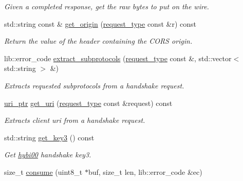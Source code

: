 \begin{DoxyCompactItemize}
\begin{DoxyCompactList}\small\item\em Given a completed response, get the raw bytes to put on the wire. \end{DoxyCompactList}\item 
std\+::string const  \& \hyperlink{classwebsocketpp_1_1processor_1_1hybi00_a6b52aa5ad8d93a153859545550ce41fc}{get\+\_\+origin} (\hyperlink{classwebsocketpp_1_1http_1_1parser_1_1request}{request\+\_\+type} const \&r) const\hypertarget{classwebsocketpp_1_1processor_1_1hybi00_a6b52aa5ad8d93a153859545550ce41fc}{}\label{classwebsocketpp_1_1processor_1_1hybi00_a6b52aa5ad8d93a153859545550ce41fc}

\begin{DoxyCompactList}\small\item\em Return the value of the header containing the C\+O\+RS origin. \end{DoxyCompactList}\item 
lib\+::error\+\_\+code \hyperlink{classwebsocketpp_1_1processor_1_1hybi00_a0d4555fa7475da449b2504ea95214f67}{extract\+\_\+subprotocols} (\hyperlink{classwebsocketpp_1_1http_1_1parser_1_1request}{request\+\_\+type} const \&, std\+::vector$<$ std\+::string $>$ \&)
\begin{DoxyCompactList}\small\item\em Extracts requested subprotocols from a handshake request. \end{DoxyCompactList}\item 
\hyperlink{namespacewebsocketpp_aae370ea5ac83a8ece7712cb39fc23f5b}{uri\+\_\+ptr} \hyperlink{classwebsocketpp_1_1processor_1_1hybi00_aa490b9d9905915023b5f2e42aac59127}{get\+\_\+uri} (\hyperlink{classwebsocketpp_1_1http_1_1parser_1_1request}{request\+\_\+type} const \&request) const\hypertarget{classwebsocketpp_1_1processor_1_1hybi00_aa490b9d9905915023b5f2e42aac59127}{}\label{classwebsocketpp_1_1processor_1_1hybi00_aa490b9d9905915023b5f2e42aac59127}

\begin{DoxyCompactList}\small\item\em Extracts client uri from a handshake request. \end{DoxyCompactList}\item 
std\+::string \hyperlink{classwebsocketpp_1_1processor_1_1hybi00_a684fe59a368d586593b1c9b97ac8526d}{get\+\_\+key3} () const
\begin{DoxyCompactList}\small\item\em Get \hyperlink{classwebsocketpp_1_1processor_1_1hybi00}{hybi00} handshake key3. \end{DoxyCompactList}\item 
size\+\_\+t \hyperlink{classwebsocketpp_1_1processor_1_1hybi00_a8065338a7a9c760a92ce24d736a3dff2}{consume} (uint8\+\_\+t $\ast$buf, size\+\_\+t len, lib\+::error\+\_\+code \&ec)\hypertarget{classwebsocketpp_1_1processor_1_1hybi00_a8065338a7a9c760a92ce24d736a3dff2}{}\label{classwebsocketpp_1_1processor_1_1hybi00_a8065338a7a9c760a92ce24d736a3dff2}


\end{DoxyCompactItemize}
